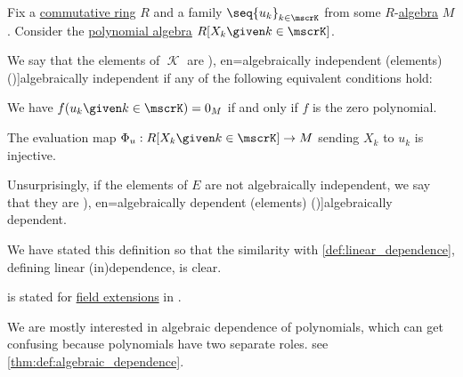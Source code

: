 \begin{definition}\label{def:algebraic_dependence}\mimprovised
  Fix a \hyperref[def:ring/commutative]{commutative ring} \( R \) and a family \( \seq{ u_k }_{k \in \mscrK} \) from some \( R \)-\hyperref[def:algebra_over_ring]{algebra} \( M \). Consider the \hyperref[def:polynomial_algebra]{polynomial algebra} \( R[X_k \given k \in \mscrK] \).

  We say that the elements of \( \mscrK \) are \term[ru=алгебрически независимые (елементы) (\cite[408]{Винберг2014КурсАлгебры}), en=algebraically independent (elements) (\cite[A.IV.4]{Bourbaki2003Algebra4to7})]{algebraically independent} if any of the following equivalent conditions hold:

  \begin{thmenum}
     We have \( f(u_k \given k \in \mscrK) = 0_M \) if and only if \( f \) is the zero polynomial.

     The evaluation map \( \Phi_u: R[X_k \given k \in \mscrK] \to M \) sending \( X_k \) to \( u_k \) is injective.
  \end{thmenum}

  Unsurprisingly, if the elements of \( E \) are not algebraically independent, we say that they are \term[ru=алгебрически зависимые (елементы) (\cite[408]{Винберг2014КурсАлгебры}), en=algebraically dependent (elements) (\cite[A.IV.4]{Bourbaki2003Algebra4to7})]{algebraically dependent}.
\end{definition}
\begin{comments}
  \item We have stated this definition so that the similarity with \cref{def:linear_dependence}, defining linear (in)dependence, is clear.

   is stated for \hyperref[def:field/subobject]{field extensions} in \cite[345]{Rotman2015AdvancedModernAlgebraPart1}.

  \item We are mostly interested in algebraic dependence of polynomials, which can get confusing because polynomials have two separate roles. see \cref{thm:def:algebraic_dependence}.
\end{comments}
